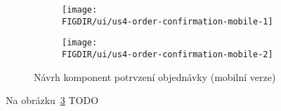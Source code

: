 \begin{figure}[H]
    \centering
    \begin{subfigure}{0.4\textwidth}
        \texttt{[image: \\FIGDIR/ui/us4-order-confirmation-mobile-1]}
        \label{fig:us4-order-confirmation-mobile-1}
    \end{subfigure}
    \hfill
    \begin{subfigure}{0.4\textwidth}
        \texttt{[image: \\FIGDIR/ui/us4-order-confirmation-mobile-2]}
        \label{fig:us4-order-confirmation-mobile-2}
    \end{subfigure}

    \caption{Návrh komponent potrvzení objednávky (mobilní verze)}
    \label{fig:us4-order-confirmation-mobile}
\end{figure}

Na obrázku~\ref{fig:us4-order-confirmation-mobile} TODO
